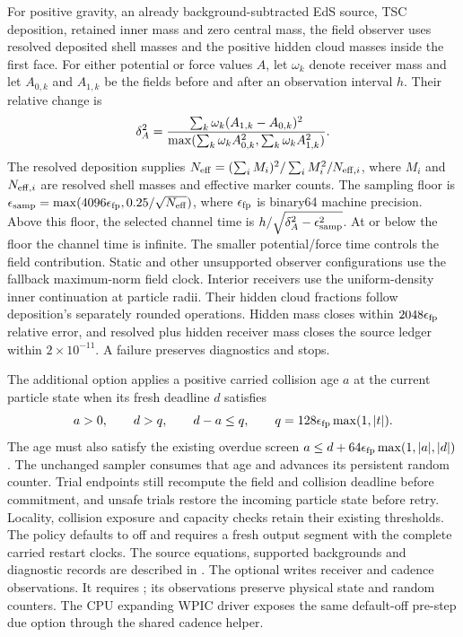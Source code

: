 For positive gravity, an already background-subtracted EdS source, TSC
deposition, retained inner mass and zero central mass, the field
observer uses resolved deposited shell masses and the positive hidden
cloud masses inside the first face. For either potential or force
values \(A\), let \(\omega_k\) denote receiver mass and let \(A_{0,k}\)
and \(A_{1,k}\) be the fields before and after an observation interval
\(h\). Their relative change is
\begin{equation}
 \delta_A^2={\sum_k\omega_k(A_{1,k}-A_{0,k})^2\over
 \max(\sum_k\omega_k A_{0,k}^2,\sum_k\omega_k A_{1,k}^2)}.
\end{equation}
The resolved deposition supplies
\(N_{\rm eff}=(\sum_i M_i)^2/\sum_i M_i^2/N_{{\rm eff},i}\),
where \(M_i\) and \(N_{{\rm eff},i}\) are resolved shell masses and
effective marker counts. The sampling floor is
\(\epsilon_{\rm samp}=\max(4096\epsilon_{\rm fp},0.25/\sqrt{N_{\rm eff}})\), where
\(\epsilon_{\rm fp}\) is binary64 machine precision. Above this floor,
the selected channel time is \(h/\sqrt{\delta_A^2-\epsilon_{\rm samp}^2}\).
At or below the floor the channel time is infinite. The smaller potential/force time
controls the field contribution. Static and other unsupported observer
configurations use the fallback maximum-norm field clock. Interior
receivers use the uniform-density inner continuation at particle radii.
Their hidden cloud fractions follow deposition's separately rounded
operations. Hidden mass closes within \(2048\epsilon_{\rm fp}\) relative
error, and resolved plus hidden receiver mass closes the source ledger
within \(2\times10^{-11}\). A failure preserves diagnostics and stops.

The additional  option applies
a positive carried collision age \(a\) at the current particle state when
its fresh deadline \(d\) satisfies
\begin{equation}
 a>0,\qquad d>q,\qquad d-a\le q,\qquad
 q=128\epsilon_{\rm fp}\max(1,|t|).
\end{equation}
The age must also satisfy the existing overdue screen
\(a\le d+64\epsilon_{\rm fp}\max(1,|a|,|d|)\). The unchanged sampler
consumes that age and advances its persistent random counter.
Trial endpoints still recompute the field and collision deadline before
commitment, and unsafe trials restore the incoming particle state before
retry. Locality, collision exposure and capacity checks retain their
existing thresholds. The policy defaults to off and requires a fresh output
segment with the complete carried restart clocks. The source equations,
supported backgrounds and diagnostic records are described in
.
The optional  writes receiver and cadence
observations. It requires ; its observations
preserve physical state and random counters. The CPU expanding WPIC driver
exposes the same default-off pre-step due option through the shared cadence
helper.

